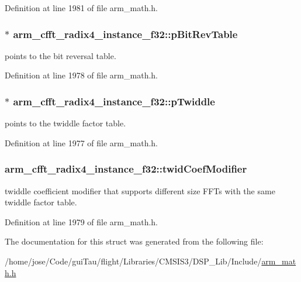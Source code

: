 Definition at line 1981 of file arm\-\_\-math.\-h.

\hypertarget{structarm__cfft__radix4__instance__f32_a8da0d2ca69749fde8cbb95caeac6fe6a}{
\subsubsection[{p\-Bit\-Rev\-Table}]{$\ast$ arm\-\_\-cfft\-\_\-radix4\-\_\-instance\-\_\-f32\-::p\-Bit\-Rev\-Table}}\label{structarm__cfft__radix4__instance__f32_a8da0d2ca69749fde8cbb95caeac6fe6a}
points to the bit reversal table. 

Definition at line 1978 of file arm\-\_\-math.\-h.

\hypertarget{structarm__cfft__radix4__instance__f32_a14860c7544911702ca1fa0bf78204ef3}{
\subsubsection[{p\-Twiddle}]{$\ast$ arm\-\_\-cfft\-\_\-radix4\-\_\-instance\-\_\-f32\-::p\-Twiddle}}\label{structarm__cfft__radix4__instance__f32_a14860c7544911702ca1fa0bf78204ef3}
points to the twiddle factor table. 

Definition at line 1977 of file arm\-\_\-math.\-h.

\hypertarget{structarm__cfft__radix4__instance__f32_abe31ea2157dfa233e389cdfd3b9993ee}{
\subsubsection[{twid\-Coef\-Modifier}]{ arm\-\_\-cfft\-\_\-radix4\-\_\-instance\-\_\-f32\-::twid\-Coef\-Modifier}}\label{structarm__cfft__radix4__instance__f32_abe31ea2157dfa233e389cdfd3b9993ee}
twiddle coefficient modifier that supports different size F\-F\-Ts with the same twiddle factor table. 

Definition at line 1979 of file arm\-\_\-math.\-h.



The documentation for this struct was generated from the following file\-:\begin{DoxyCompactItemize}
\item 
/home/jose/\-Code/gui\-Tau/flight/\-Libraries/\-C\-M\-S\-I\-S3/\-D\-S\-P\-\_\-\-Lib/\-Include/\hyperlink{arm__math_8h}{arm\-\_\-math.\-h}\end{DoxyCompactItemize}
